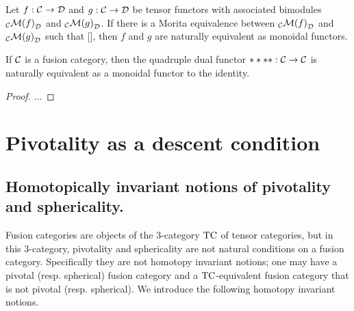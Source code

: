 \documentclass{amsart}
\begin{document}

\begin{lemma}
Let $f: \mathcal C \rightarrow \mathcal D$ and $g: \mathcal C \rightarrow \mathcal D$ be tensor functors with associated bimodules ${}_{\mathcal C} {\mathcal M(f)}_{\mathcal D}$ and ${}_{\mathcal C} {\mathcal M(g)}_{\mathcal D}$.  If there is a Morita equivalence between ${}_{\mathcal C} {\mathcal M(f)}_{\mathcal D}$ and ${}_{\mathcal C} {\mathcal M(g)}_{\mathcal D}$ such that [], then $f$ and $g$ are naturally equivalent as monoidal functors.
\end{lemma}

\begin{theorem} \label{thm-quaddual}
If $\mathcal C$ is a fusion category, then the quadruple dual functor $****: \mathcal C \rightarrow \mathcal C$ is naturally equivalent as a monoidal functor to the identity.
\end{theorem}

\begin{proof}
...
\end{proof}




\section{Pivotality as a descent condition} \label{sec-pivot}

\subsection{Homotopically invariant notions of pivotality and sphericality.}

Fusion categories are objects of the 3-category $\mathrm{TC}$ of tensor categories, but in this 3-category, pivotality and sphericality are not natural conditions on a fusion category.  Specifically they are not homotopy invariant notions; one may have a pivotal (resp. spherical) fusion category and a $\mathrm{TC}$-equivalent fusion category that is not pivotal (resp. spherical).    We introduce the following homotopy invariant notions.
\end{document}
